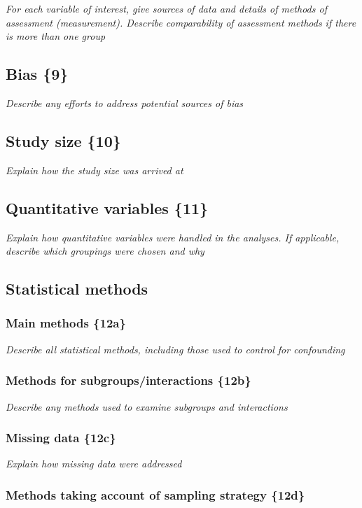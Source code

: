 {\em For each variable of interest, give sources of data and details of
methods of assessment (measurement). Describe comparability of
assessment methods if there is more than one group}

\subsection{Bias \{9\}}

{\em Describe any efforts to address potential sources of bias }

\subsection{Study size \{10\}}

{\em Explain how the study size was arrived at}

\subsection{Quantitative variables \{11\}}

{\em Explain how quantitative variables were handled in the analyses. If
applicable, describe which groupings were chosen and why}

\subsection{Statistical methods}

\subsubsection{Main methods \{12a\}}

{\em Describe all statistical methods, including those used to control for
confounding}

\subsubsection{Methods for subgroups/interactions \{12b\}}

{\em Describe any methods used to examine subgroups and interactions}

\subsubsection{Missing data \{12c\}}

{\em Explain how missing data were addressed}

\subsubsection{Methods taking account of sampling strategy \{12d\}}

